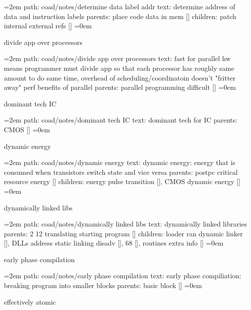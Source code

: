 \leftskip=2em
path: coad/notes/determine data label addr
\smallskip
text:  determine address of data and instruction labels
\smallskip
parents:  place code data in mem []
\smallskip
children: patch internal external refs []
\smallskip
\leftskip=0em
\par\endgroup
\bigskip
{}
divide app over processors
\smallskip
\par\begingroup
\leftskip=2em
path: coad/notes/divide app over processors
\smallskip
text:  fast for parallel hw means programmer must divide app so that each processor has roughly same amount to do same time, overhead of scheduling/coordinatoin doesn't "fritter away" perf benefits of parallel
\smallskip
parents:  parallel programming difficult []
\smallskip
\leftskip=0em
\par\endgroup
\bigskip
{}
dominant tech IC
\smallskip
\par\begingroup
\leftskip=2em
path: coad/notes/dominant tech IC
\smallskip
text:  dominant tech for IC
\smallskip
parents:  CMOS []
\smallskip
\leftskip=0em
\par\endgroup
\bigskip
{}
dynamic energy
\smallskip
\par\begingroup
\leftskip=2em
path: coad/notes/dynamic energy
\smallskip
text:  dynamic energy: energy that is consumed when transistors switch state and vice versa
\smallskip
parents:  postpc critical resource energy []
\smallskip
children: energy pulse transition [], CMOS dynamic energy []
\smallskip
\leftskip=0em
\par\endgroup
\bigskip
{}
dynamically linked libs
\smallskip
\par\begingroup
\leftskip=2em
path: coad/notes/dynamically linked libs
\smallskip
text:  dynamically linked libraries
\smallskip
parents:  2 12 translating starting program []
\smallskip
children: loader ran dynamic linker [], DLLs address static linking disadv [], 68 [], routines extra info []
\smallskip
\leftskip=0em
\par\endgroup
\bigskip
{}
early phase compilation
\smallskip
\par\begingroup
\leftskip=2em
path: coad/notes/early phase compilation
\smallskip
text:  early phase compiliation: breaking program into smaller blocks
\smallskip
parents:  basic block []
\smallskip
\leftskip=0em
\par\endgroup
\bigskip
{}
effectively atomic
